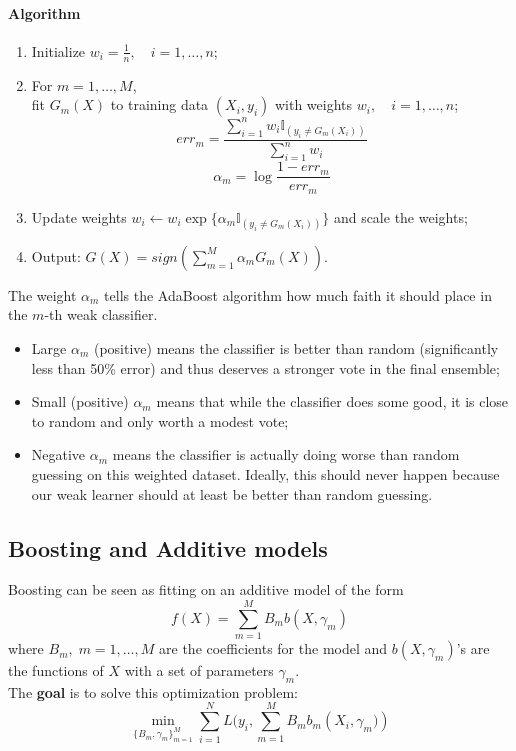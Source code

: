 \documentclass[12pt]{book}
\theoremstyle{definition}
\theoremstyle{remark}
\begin{document}
\paragraph{Algorithm}
\begin{enumerate}
    \item Initialize $w_i = \frac1n,\quad i=1,\dots, n$;
    \item For $m = 1,\dots, M$,\\
    fit $G_m(X)$ to training data $(X_i,y_i)$ with weights $w_i,\quad i=1,\dots,n$;
    \[err_{m} = \frac{\sum_{i=1}^n w_i \mathbb{I}_{(y_i \ne G_m(X_i))}}{\sum_{i=1}^n w_i}\]
    \[\alpha_m = \log \frac{1-err_m}{err_m}\]
    \item Update weights $w_i \leftarrow w_i \exp\{\alpha_m\mathbb{I}_{(y_i \ne G_m(X_i))}\}$ and scale the weights;
    \item Output: $\hat{G}(X) = sign \left(\sum_{m=1}^M \alpha_mG_m(X)\right)$.
\end{enumerate}



\begin{notionbox}
    The weight $\alpha_m$ tells the AdaBoost algorithm how much faith it should place in the $m$-th weak classifier.
    \begin{itemize}
        \item Large $\alpha_m$ (positive) means the classifier is better than random (significantly less than 50\% error) and thus deserves a stronger vote in the final ensemble;
        \item Small (positive) $\alpha_m$ means that while the classifier does some good, it is close to random and only worth a modest vote;
        \item Negative $\alpha_m$ means the classifier is actually doing worse than random guessing on this weighted dataset.
        Ideally, this should never happen because our weak learner should at least be better than random guessing.
    \end{itemize}
\end{notionbox}


\subsection{Boosting and Additive models}
Boosting can be seen as fitting on an additive model of the form
\[f(X) = \sum_{m=1}^M B_m b(X,\gamma_m)\]
where $B_m,\; m = 1, \dots, M$ are the coefficients for the model and $b(X, \gamma_m)$'s are the functions of $X$ with a set of parameters $\gamma_m$. \\
The \textbf{goal} is to solve this optimization problem:
\[\underset{\{B_m, \gamma_m\}_{m = 1}^M}{\min}\sum_{i=1}^NL(y_i, \sum_{m=1}^MB_mb_m\left(X_i, \gamma_m)\right)\]
\end{document}
